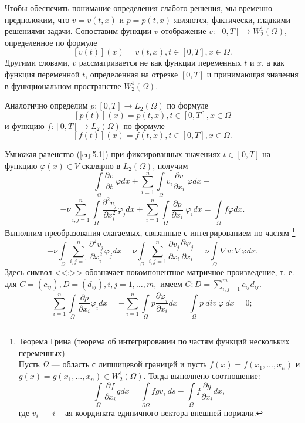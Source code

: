 Чтобы обеспечить понимание определения слабого решения, мы временно предположим, что $v=v(t, x)$ и $p=p(t, x)$ являются, фактически, гладкими решениями задачи.
Сопоставим функции $v$ отображение $v:[0, T]\rightarrow W^1_2(\Omega)$, определенное по формуле $$[v(t)](x)=v(t, x), t\in[0, T], x\in\Omega.$$
Другими словами, $v$ рассматривается не как функции переменных $t$ и $x$, а как функция переменной $t$, определенная на отрезке
$[0, T]$ и принимающая значения в функциональном пространстве $W^1_2(\Omega)$.

Аналогично определим $p:[0, T]\rightarrow L_2(\Omega)$ по формуле $$[p(t)](x)=p(t, x), t\in[0, T], x\in\Omega$$
и функцию $f:[0, T]\rightarrow L_2(\Omega)$ по формуле $$[f(t)](x)=f(t, x), t\in[0, T], x\in\Omega.$$

Умножая равенство (\ref{eq:5.1}) при фиксированных значениях $t\in [0, T]$ на функцию $\varphi (x)\in V$ скалярно в $L_2(\Omega)$, получим
$$\int\limits_\Omega \frac{\partial v}{\partial t}\ \varphi dx+\sum_{i=1}^n\int\limits_\Omega v_i\frac{\partial v}{\partial x_i}\ \varphi dx-$$
$$-\nu \sum_{i, j=1}^n\int\limits_\Omega\frac{\partial^2 v_j}{\partial x^{2}_i} \varphi_j dx+
\sum_{i=1}^n\int\limits_\Omega \frac{\partial p}{\partial x_i}\ \varphi_idx=\int\limits_\Omega f\varphi dx.$$
Выполним преобразования слагаемых, связанные с интегрированием по частям
\footnote{Теорема Грина (теорема об интегрировании по частям функций нескольких переменных)\\
 Пусть $\Omega$ --- область с липшицевой границей и пусть $f(x)=f(x_1,...,x_n)$ и $g(x)=g(x_1,...,x_n)\in W_2^1(\Omega).$
 Тогда выполнено соотношение:
 $$\int\limits_\Omega\frac{\partial f}{\partial x_i} gdx=\int\limits_{\partial\Omega} fgv_i \ ds-\int\limits_\Omega f \frac{\partial g}{\partial x_i} dx,$$
 где $v_i$ --- $i-$ая координата единичного вектора внешней нормали.
}
$$-\nu\int\limits_\Omega \sum_{i,j=1}^{n}\frac{\partial^2 v_j}{\partial x^{2}_i}\varphi_j dx=
\nu\int\limits_\Omega\sum_{i, j=1}^{n}\frac{\partial v_j}{\partial x_i}\frac{\partial \varphi_j}{\partial x_i}=\nu\int\limits_\Omega \nabla v:\nabla\varphi dx.$$
\clearpage
Здесь символ <<:>> обозначает покомпонентное матричное произведение, т. е. для $ C=(c_{ij}), D=(d_{ij}), i, j=1,\ldots,m,$ имеем $C:D=\sum\limits_{i,j=1}^{m} c_{ij}d_{ij}.$
$$\sum_{i=1}^{n}\int\limits_\Omega \frac{\partial p}{\partial x_i}\varphi_i dx
=-\sum_{i=1}^{n}\int\limits_\Omega p\frac{\partial \varphi_i}{\partial x_i}dx= \int\limits_\Omega p \ div \ \varphi \ dx=0;$$

